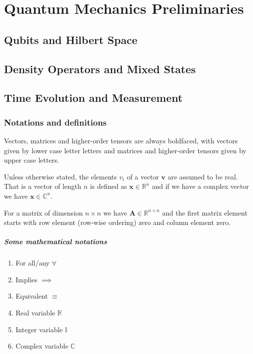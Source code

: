 \chapter{Quantum Mechanics Preliminaries}


\section{Qubits and Hilbert Space}
\section{Density Operators and Mixed States}
\section{Time Evolution and Measurement}




\subsection{Notations and definitions}

Vectors, matrices and higher-order tensors are always boldfaced, with vectors
given by lower case letter letters and matrices and higher-order tensors given by upper case letters.

Unless otherwise stated, the elements $v_i$ of a vector $\bm{v}$ are assumed to be real. That is a vector of length $n$ is defined as
$\bm{x}\in \mathbb{R}^{n}$ and if we have a complex vector we have $\bm{x}\in \mathbb{C}^{n}$.

For a matrix of dimension $n\times n$ we have 
$\bm{A}\in \mathbb{R}^{n\times n}$ and the first matrix element starts with row element (row-wise ordering) zero and column element zero.


\paragraph{Some  mathematical notations}
\begin{enumerate}
\item For all/any  $\forall$

\item Implies $\implies$

\item Equivalent $\equiv$

\item Real variable $\mathbb{R}$

\item Integer variable $\mathbb{I}$

\item Complex  variable $\mathbb{C}$
\end{enumerate}



